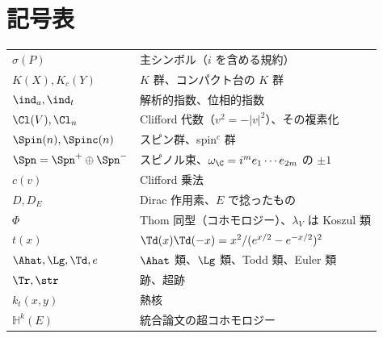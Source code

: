 \section*{記号表}
\begin{tabular}{lp{10cm}}
$\sigma(P)$ & 主シンボル（$i$ を含める規約）\\
$K(X),K_c(Y)$ & $K$ 群、コンパクト台の $K$ 群\\
$\ind_a,\ind_t$ & 解析的指数、位相的指数\\
$\Cl(V),\Cl_n$ & Clifford 代数（$v^2=-|v|^2$）、その複素化\\
$\Spin(n),\Spinc(n)$ & スピン群、spin$^c$ 群\\
$\Spn=\Spn^+\oplus\Spn^-$ & スピノル束、$\omega_{\C}=i^me_1\cdots e_{2m}$ の $\pm1$\\
$c(v)$ & Clifford 乗法\\
$D,D_E$ & Dirac 作用素、$E$ で捻ったもの\\
$\Phi$ & Thom 同型（コホモロジー）、$\lambda_V$ は Koszul 類\\
$t(x)$ & $\Td(x)\Td(-x)=x^2/(e^{x/2}-e^{-x/2})^2$\\
$\Ahat,\Lg,\Td,e$ & $\Ahat$ 類、$\Lg$ 類、Todd 類、Euler 類\\
$\Tr,\str$ & 跡、超跡\\
$k_t(x,y)$ & 熱核\\
$\mathbb H^k(E)$ & 統合論文の超コホモロジー\\
\end{tabular}

